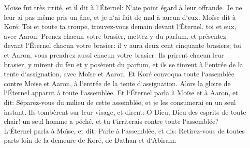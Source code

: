 \verse Moïse fut très irrité, et il dit à l`Éternel: N`aie point égard à leur offrande. Je ne leur ai pas même pris un âne, et je n`ai fait de mal à aucun d`eux. 
\verse Moïse dit à Koré: Toi et toute ta troupe, trouvez-vous demain devant l`Éternel, toi et eux, avec Aaron. 
\verse Prenez chacun votre brasier, mettez-y du parfum, et présentez devant l`Éternel chacun votre brasier: il y aura deux cent cinquante brasiers; toi et Aaron, vous prendrez aussi chacun votre brasier. 
\verse Ils prirent chacun leur brasier, y mirent du feu et y posèrent du parfum, et ils se tinrent à l`entrée de la tente d`assignation, avec Moïse et Aaron. 
\verse Et Koré convoqua toute l`assemblée contre Moïse et Aaron, à l`entrée de la tente d`assignation. Alors la gloire de l`Éternel apparut à toute l`assemblée. 
\verse Et l`Éternel parla à Moïse et à Aaron, et dit: 
\verse Séparez-vous du milieu de cette assemblée, et je les consumerai en un seul instant. 
\verse Ils tombèrent sur leur visage, et dirent: O Dieu, Dieu des esprits de toute chair! un seul homme a péché, et tu t`irriterais contre toute l`assemblée? 
\verse L`Éternel parla à Moïse, et dit: 
\verse Parle à l`assemblée, et dis: Retirez-vous de toutes parts loin de la demeure de Koré, de Dathan et d`Abiram. 
